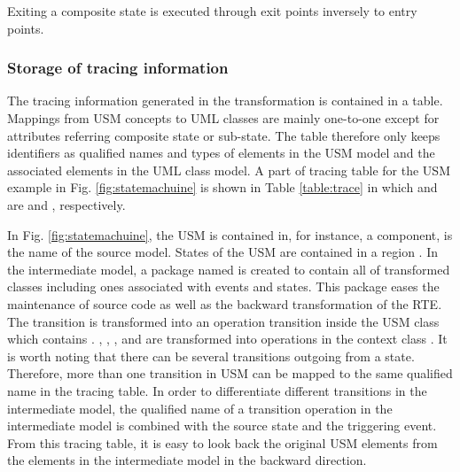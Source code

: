 Exiting a composite state is executed through exit points inversely to entry points. %

\subsubsection{Storage of tracing information}
\label{subsec:trace}
The tracing information generated in the transformation is contained in a table. Mappings from USM concepts to UML classes are mainly one-to-one except for attributes referring composite state or sub-state. The table therefore only keeps identifiers as qualified names and types of elements in the USM model and the associated elements in the UML class model. A part of tracing table for the USM example in Fig. \ref{fig:statemachuine} is shown in Table \ref{table:trace} in which  and  are  and , respectively.

In Fig. \ref{fig:statemachuine}, the USM is contained in, for instance, a  component,  is the name of the source model. States of the USM are contained in a region . In the intermediate model, a package named  is created to contain all of transformed classes including ones associated with events and states. This package eases the maintenance of source code as well as the backward transformation of the RTE. The transition  is transformed into an operation transition inside the USM class which contains . , , , and  are transformed into operations in the context class . It is worth noting that there can be several transitions outgoing from a state. Therefore, more than one transition in USM can be mapped to the same qualified name in the tracing table. In order to differentiate different transitions in the intermediate model, the qualified name of a transition operation in the intermediate model is combined with the source state and the triggering event. From this tracing table, it is easy to look back the original USM elements from the elements in the intermediate model in the backward direction. %

